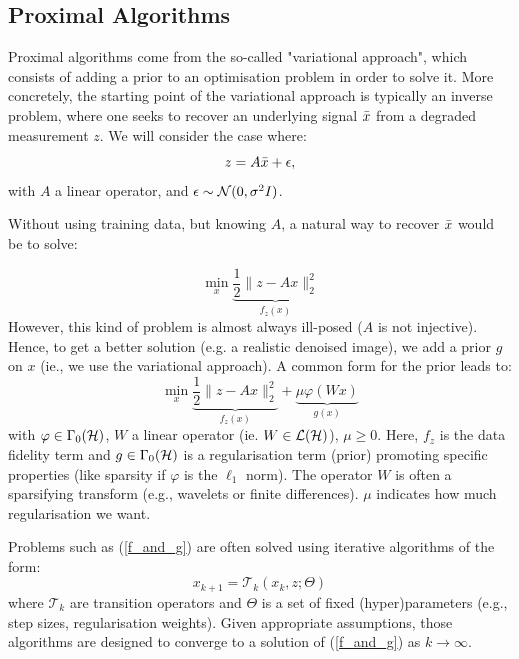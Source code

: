 \documentclass[a4paper,11pt]{article}
\renewcommand{\geq}{\ensuremath{\geqslant}}
\theoremstyle{plain}{\theorembodyfont{\rmfamily}%
\newtheorem{proposition}[theorem]{Proposition}}
\theoremstyle{plain}{\theorembodyfont{\rmfamily}%
\newtheorem{notation}[theorem]{Notation}}
\theoremstyle{plain}{\theorembodyfont{\rmfamily}%
\newtheorem{assumption}[theorem]{Assumption}}
\theoremstyle{plain}{\theorembodyfont{\rmfamily}%
\newtheorem{problem}[theorem]{Problem}}
\theoremstyle{plain}{\theorembodyfont{\rmfamily}%
\newtheorem{example}[theorem]{Example}}
\theoremstyle{plain}{\theorembodyfont{\rmfamily}%
\newtheorem{remark}[theorem]{Remark}}
\theoremstyle{plain}{\theorembodyfont{\rmfamily}%
\newtheorem{definition}[theorem]{Definition}}
\theoremstyle{plain}{\theorembodyfont{\rmfamily}%
\newtheorem{question}[theorem]{Question}}
\numberwithin{equation}{section}
\begin{document}
\subsection{Proximal Algorithms}

Proximal algorithms come from the so-called "variational approach", which consists of adding a prior to an optimisation problem in order to solve it. More concretely, the starting point of the variational approach is typically an inverse problem, where one seeks to recover an underlying signal $\Bar{x}$ from a degraded measurement $z$. We will consider the case where:
\begin{equation}\label{eq:inv-pb}
    z = A\Bar{x} + \epsilon,
\end{equation}
with $A$ a linear operator, and $\epsilon \sim {\ensuremath{\mathcal{N}}}(0, \sigma^2I)$.

Without using training data, but knowing $A$, a natural way to recover $\Bar{x}$ would be to solve:

\begin{equation}
    \min_{x} \underbrace{\frac{1}{2} \| z - Ax \|_2^2}_{f_z(x)}
\end{equation}
However, this kind of problem is almost always ill-posed ($A$ is not injective). Hence, to get a better solution (e.g. a realistic denoised image), we add a prior $g$ on $x$ (ie., we use the variational approach). A common form for the prior leads to:
\begin{equation}\label{f_and_g}
    \min_{x} \underbrace{\frac{1}{2} \| z - Ax \|_2^2}_{f_z(x)} + \underbrace{\mu \varphi( W x)}_{g(x)}
\end{equation}
with $\varphi \in \Gamma_0({\mathcal{H}})$, $W$ a linear operator (ie. $W \in {\ensuremath{\mathcal{L}}}({\mathcal{H}})$), $\mu \geq 0$. Here, $f_z$ is the data fidelity term and $g \in \Gamma_0({\mathcal{H}})$ is a regularisation term (prior) promoting specific properties (like sparsity if $\varphi$ is the $\ell_1$ norm). The operator $W$ is often a sparsifying transform (e.g., wavelets or finite differences). $\mu$ indicates how much regularisation we want.

Problems such as (\ref{f_and_g}) are often solved using iterative algorithms of the form:
\begin{equation}\label{algo_prox}
    x_{k+1} = \mathcal{T}_k(x_k, z; \Theta)
\end{equation}
where $\mathcal{T}_k$ are transition operators and $\Theta$ is a set of fixed (hyper)parameters (e.g., step sizes, regularisation weights). Given appropriate assumptions, those algorithms are designed to converge to a solution of (\ref{f_and_g}) as $k \xrightarrow{} \infty$.
\end{document}
